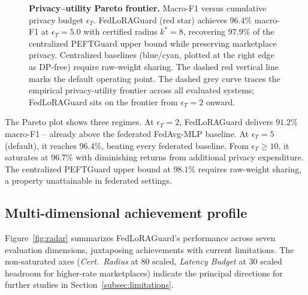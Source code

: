 \documentclass[12pt,a4paper]{article}
\theoremstyle{definition}
\theoremstyle{remark}
\newcommand{\modelname}{FedLoRAGuard}
\begin{document}
\begin{figure}[!t]
\caption{\textbf{Privacy--utility Pareto frontier.} Macro-F1 versus cumulative privacy budget $\epsilon_T$. \modelname{} (red star) achieves $96.4\%$ macro-F1 at $\epsilon_T = 5.0$ with certified radius $k^* = 8$, recovering $97.9\%$ of the centralized PEFTGuard upper bound while preserving marketplace privacy. Centralized baselines (blue/cyan, plotted at the right edge as DP-free) require raw-weight sharing. The dashed red vertical line marks the default operating point. The dashed grey curve traces the empirical privacy-utility frontier across all evaluated systems; \modelname{} sits on the frontier from $\epsilon_T = 2$ onward.}
\label{fig:pareto}
\end{figure}

The Pareto plot shows three regimes. At $\epsilon_T = 2$, \modelname{} delivers $91.2\%$ macro-F1 -- already above the federated FedAvg-MLP baseline. At $\epsilon_T = 5$ (default), it reaches $96.4\%$, beating every federated baseline. From $\epsilon_T \geq 10$, it saturates at $96.7\%$ with diminishing returns from additional privacy expenditure. The centralized PEFTGuard upper bound at $98.1\%$ requires raw-weight sharing, a property unattainable in federated settings.

\subsection{Multi-dimensional achievement profile}

Figure~\ref{fig:radar} summarizes \modelname{}'s performance across seven evaluation dimensions, juxtaposing achievements with current limitations. The non-saturated axes (\emph{Cert.\ Radius} at $80$ scaled, \emph{Latency Budget} at $30$ scaled headroom for higher-rate marketplaces) indicate the principal directions for further studies in Section~\ref{subsec:limitations}.
\end{document}
